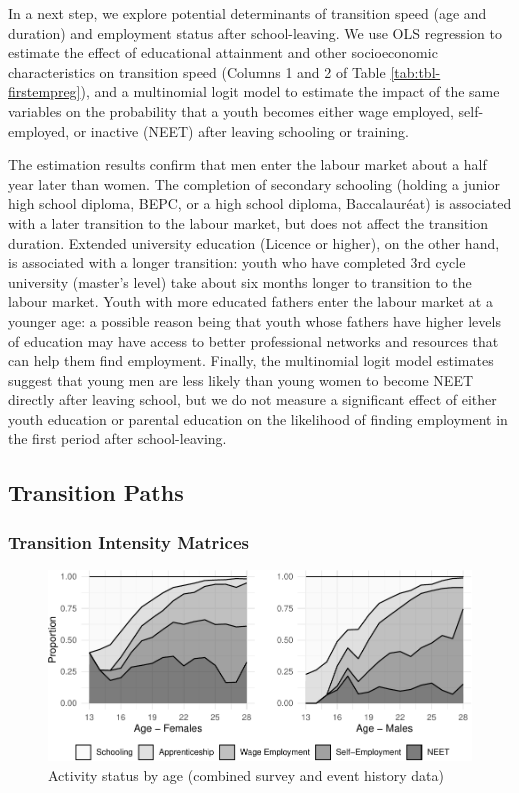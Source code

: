 \documentclass[
  a4paper, twoside, 12pt]{book}
\begin{document}
\newpage

In a next step, we explore potential determinants of transition speed (age and duration) and employment status after school-leaving. We use OLS regression to estimate the effect of educational attainment and other socioeconomic characteristics on transition speed (Columns 1 and 2 of Table \ref{tab:tbl-firstempreg}), and a multinomial logit model to estimate the impact of the same variables on the probability that a youth becomes either wage employed, self-employed, or inactive (NEET) after leaving schooling or training.

The estimation results confirm that men enter the labour market about a half year later than women. The completion of secondary schooling (holding a junior high school diploma, BEPC, or a high school diploma, Baccalauréat) is associated with a later transition to the labour market, but does not affect the transition duration. Extended university education (Licence or higher), on the other hand, is associated with a longer transition: youth who have completed 3rd cycle university (master's level) take about six months longer to transition to the labour market. Youth with more educated fathers enter the labour market at a younger age: a possible reason being that youth whose fathers have higher levels of education may have access to better professional networks and resources that can help them find employment. Finally, the multinomial logit model estimates suggest that young men are less likely than young women to become NEET directly after leaving school, but we do not measure a significant effect of either youth education or parental education on the likelihood of finding employment in the first period after school-leaving.

\hypertarget{survey-paths}{%
\subsection{Transition Paths}\label{survey-paths}}

\hypertarget{transition-intensity-matrices}{%
\subsubsection*{Transition Intensity Matrices}\label{transition-intensity-matrices}}

\begin{figure}[H]
\includegraphics{figures/fig-ageplot-1} \caption{Activity status by age (combined survey and event history data)}\label{fig:fig-ageplot}
\end{figure}
\end{document}
